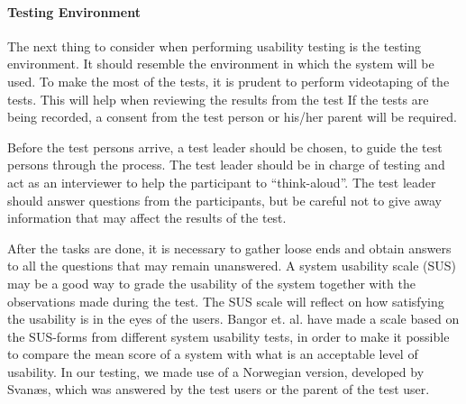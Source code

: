 \paragraph{Testing Environment}
\label{par:testingenvironment}
The next thing to consider when performing usability testing is the testing environment. It should resemble the environment in which the system will be used. To make the most of the tests, it is prudent to perform videotaping of the tests. This will help when reviewing the results from the test If the tests are being recorded, a consent from the test person or his/her parent will be required.

Before the test persons arrive, a test leader should be chosen, to guide the test persons through the process. The test leader should be in charge of testing and act as an interviewer to help the participant to ``think-aloud''\cite{lewis1982using}. The test leader should answer questions from the participants, but be careful not to give away information that may affect the results of the test.

After the tasks are done, it is necessary to gather loose ends and obtain answers to all the questions that may remain unanswered. A system usability scale (SUS)\cite{sus} may be a good way to grade the usability of the system together with the observations made during the test. The SUS scale will reflect on how satisfying the usability is in the eyes of the users. Bangor et. al.\cite{susform} have made a scale based on the SUS-forms from different system usability tests, in order to make it possible to compare the mean score of a system with what is an acceptable level of usability. In our testing, we made use of a Norwegian version, developed by Svan\ae s, which was answered by the test users or the parent of the test user.


